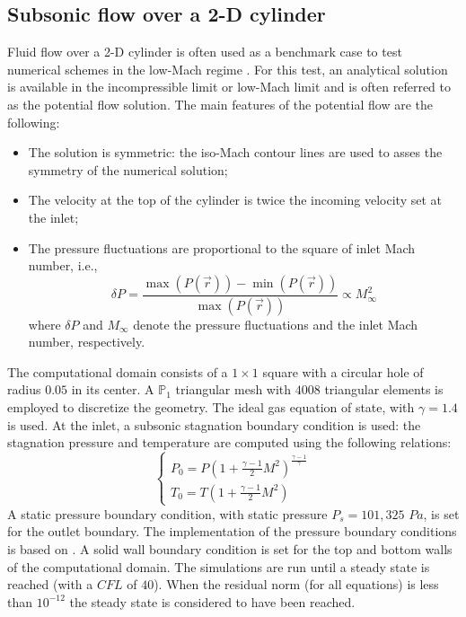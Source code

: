 \documentclass[preprint,10pt]{elsarticle}
\begin{document}
\subsection{Subsonic flow over a 2-D cylinder} \label{sec:cylinder}

Fluid flow over a 2-D cylinder is often used as a benchmark case to test numerical schemes in the low-Mach regime \cite{LowMach1, LowMach2, LowMach3}. For this test, an analytical solution is available in the incompressible limit or low-Mach limit and is often referred to as the potential flow solution. The main features of the potential flow are the following:
%
\begin{itemize}
\item The solution is symmetric: the iso-Mach contour lines are used to asses the symmetry of the numerical solution;
\item The velocity at the top of the cylinder is twice the incoming velocity set at the inlet;
\item The pressure fluctuations are proportional to the square of inlet Mach number, i.e., 
\begin{equation}
\delta P = \frac{\max(P(\vec{r})) - \min(P(\vec{r}))}{\max(P(\vec{r}))}  \propto M_\infty^2
\end{equation}
where $\delta P$ and $M_\infty$ denote the pressure fluctuations and the inlet Mach number, respectively.
\end{itemize}
%
The computational domain consists of a $1\times 1$ square with a circular hole of radius $0.05$ in its center. A $\mathbb{P}_1$ triangular mesh with $4008$ triangular elements is employed to discretize the geometry. The ideal gas equation of state, with $\gamma=1.4$ is used. At the inlet, a subsonic stagnation boundary condition is used: the stagnation pressure and temperature are computed using the following relations:
%
\begin{equation}
\label{eq:stagnation_relations}
\left\{
\begin{array}{l}
P_0 = P\left( 1 + \frac{\gamma-1}{2} M^2 \right)^{\frac{\gamma-1}{\gamma}} \\
T_0 = T\left( 1 + \frac{\gamma-1}{2} M^2 \right)
\end{array}
\right.
\end{equation}
%
A static pressure boundary condition, with static pressure $P_s = 101,325$ $Pa$, is set for the outlet boundary. The implementation of the pressure boundary conditions is based on \cite{SEM}. A solid wall boundary condition is set for the top and bottom walls of the computational domain. The simulations are run until a steady state is reached (with a $CFL$ of $40$). When the residual norm (for all equations) is less than $10^{-12}$ the steady state is considered to have been reached.
\end{document}
